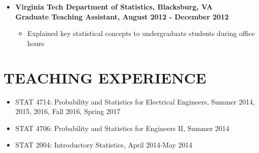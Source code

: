 \documentclass[10pt]{article}
\begin{document}
\begin{itemize}
\item[] \textbf{Virginia Tech Department of Statistics, Blacksburg, VA\\
Graduate Teaching Assistant, August 2012 - December 2012}
\begin{itemize}
\item Explained key statistical concepts to undergraduate students during office hours
\end{itemize}



%
%
\end{itemize}


\section*{TEACHING EXPERIENCE}
\begin{itemize}
\item STAT 4714: Probability and Statistics for Electrical Engineers, Summer 2014, 2015, 2016, Fall 2016, Spring 2017
\item STAT 4706: Probability and Statistics for Engineers II, Summer 2014
\item STAT 2004: Introductory Statistics, April 2014-May 2014
\end{itemize}
\end{document}
